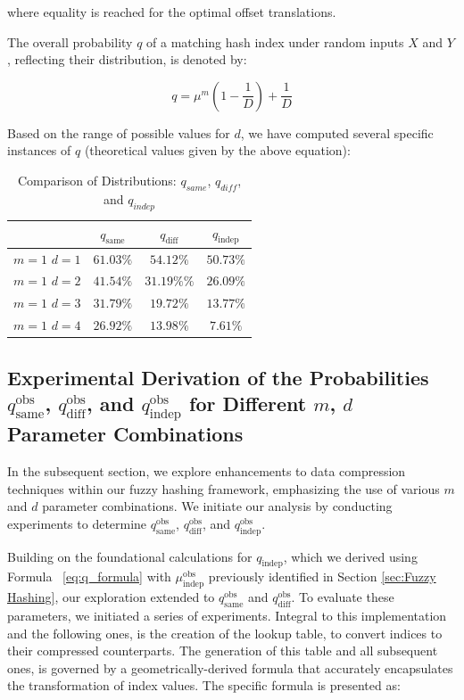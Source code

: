 where equality is reached for the optimal offset translations.

The overall probability \( q \) of a matching hash index under random inputs \( X \) and \( Y \), reflecting their distribution, is denoted by:

\begin{equation}
    q = \mu^m\left(1 - \frac{1}{D}\right) + \frac{1}{D}
    \label{eq:q_formula}
\end{equation}
    

Based on the range of possible values for \(d\), we have computed several specific instances of \(q\) (theoretical values given by the above equation):
\begin{table}[H]
    \centering
    \renewcommand{\arraystretch}{1.25}\begin{tabular}{|c|c|c|c|}
        \hline
        & $q_{\text{same}}$ & $q_{\text{diff}}$ & $q_{\text{indep}}$\\
        \hline
        \(m = 1\) \(d = 1\) & $61.03\%$ & $54.12\%$ & $50.73\%$\\
        \(m = 1\) \(d = 2\) & $41.54\%$ & $31.19\%\%$ & $26.09\%$\\
        \(m = 1\) \(d = 3\) & $31.79\%$ & $19.72\%$ & $13.77\%$\\
        \(m = 1\) \(d = 4\) & $26.92\%$ & $13.98\%$ & $7.61\%$\\
        \hline
    \end{tabular}
\caption{Comparison of Distributions: $q_{same}$, $q_{diff}$, and $q_{indep}$}
\label{tab:theoretical_q}
\end{table}

\subsection{Experimental Derivation of the Probabilities $q_{\text{same}}^{\text{obs}}$, $q_{\text{diff}}^{\text{obs}}$, and $q_{\text{indep}}^{\text{obs}}$ for Different \(m\), \(d\) Parameter Combinations} \label{sec:Experimental_derivation_q}

In the subsequent section, we explore enhancements to data compression techniques within our fuzzy hashing framework, emphasizing the use of various \(m\) and \(d\) parameter combinations. We initiate our analysis by conducting experiments to determine \(q_{\text{same}}^{\text{obs}}\), \(q_{\text{diff}}^{\text{obs}}\), and \(q_{\text{indep}}^{\text{obs}}\).

Building on the foundational calculations for \(q_{\text{indep}}\), which we derived using Formula ~\ref{eq:q_formula} with \( \mu^{\text{obs}}_{\text{indep}} \) previously identified in Section \ref{sec:Fuzzy Hashing}, our exploration extended to \(q^{\text{obs}}_{\text{same}}\) and \(q^{\text{obs}}_\text{diff}\). To evaluate these parameters, we initiated a series of experiments. Integral to this implementation and the following ones, is the creation of the lookup table, to convert indices to their compressed counterparts. The generation of this table and all subsequent ones, is governed by a geometrically-derived formula that accurately encapsulates the transformation of index values. The specific formula is presented as:

